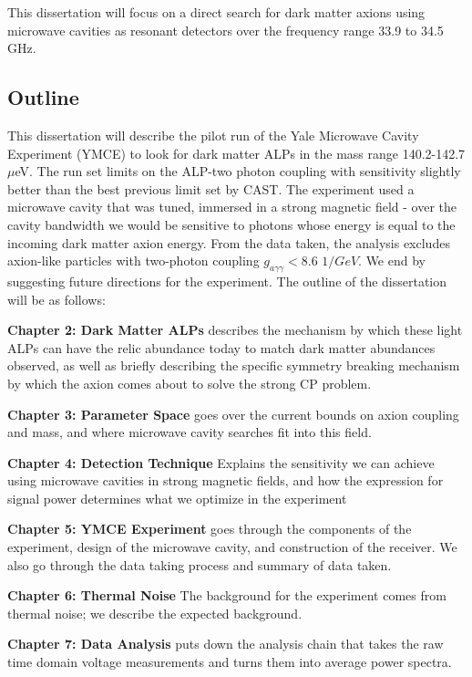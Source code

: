 \documentclass[12pt, twoside]{book}
\begin{document}
This dissertation will focus on a direct search for dark matter axions using microwave cavities as resonant detectors over the frequency range 33.9 to 34.5 GHz.

\subsection{Outline}

This dissertation will describe the pilot run of the Yale Microwave Cavity Experiment (YMCE) to look for dark matter ALPs in the mass range 140.2-142.7 $\mu$eV. The run set limits on the ALP-two photon coupling with sensitivity slightly better than the best previous limit set by CAST. The experiment used a microwave cavity that was tuned, immersed in a strong magnetic field - over the cavity bandwidth we would be sensitive to photons whose energy is equal to the incoming dark matter axion energy.  From the data taken, the analysis excludes axion-like particles with two-photon coupling $g_{a\gamma\gamma} < 8.6$ $1/GeV$. We end by suggesting future directions for the experiment.
The outline of the dissertation will be as follows:

\textbf{Chapter 2: Dark Matter ALPs} describes the mechanism by which these light ALPs can have the relic abundance today to match dark matter abundances observed, as well as briefly describing the specific symmetry breaking mechanism by which the axion comes about to solve the strong CP problem.

\textbf{Chapter 3: Parameter Space} goes over the current bounds on axion coupling and mass, and where microwave cavity searches fit into this field.

\textbf{Chapter 4: Detection Technique} Explains the sensitivity we can achieve using microwave cavities in strong magnetic fields, and how the expression for signal power determines what we optimize in the experiment

\textbf{Chapter 5: YMCE Experiment} goes through the components of the experiment, design of the microwave cavity, and construction of the receiver. We also go through the data taking process and summary of data taken.

\textbf{Chapter 6: Thermal Noise} The background for the experiment comes from thermal noise; we describe the expected background.

\textbf{Chapter 7: Data Analysis} puts down the analysis chain that takes the raw time domain voltage measurements and turns them into average power spectra. 
\end{document}
